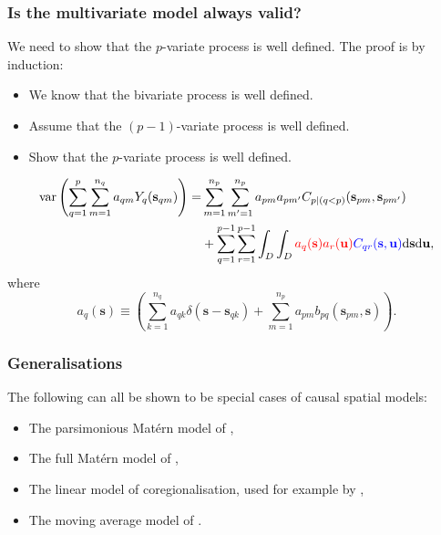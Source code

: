 \documentclass{beamer}
\newcommand{\intd} {\mathrm{d}}
\newcommand{\svec} {\textbf{s}}
\newcommand{\uvec} {\textbf{u}}
\newcommand{\var}{\mathrm{var}}
\newcommand{\red}{\textcolor{red}}%
\newcommand{\blue}{\textcolor{blue}}
\begin{document}
\begin{frame}
\frametitle{Is the multivariate model always valid?}

We need to show that the $p$-variate process is well defined. The proof is by induction:
\begin{itemize}
  \item We know that the bivariate process is well defined.
  \item Assume that the $(p-1)$-variate process is well defined.
  \item Show that the $p$-variate process is well defined.
\end{itemize}

\vspace{-0.3in}
\begin{align*}
\var\left(\sum_{q=1}^p \sum_{m=1}^{n_q} a_{qm}Y_q(\svec_{qm})\right)=& \sum_{m=1}^{n_p}\sum_{m'=1}^{n_p}a_{pm}a_{pm'}C_{p \mid  (q < p)}(\svec_{pm},\svec_{pm'}) \\
&+ \sum_{q=1}^{p-1}\sum_{r=1}^{p-1}\int_D\int_D\red{a_q(\svec)a_r(\uvec)}\blue{C_{qr}(\svec,\uvec)}\intd \svec \intd \uvec, 
\end{align*}
where
\begin{equation*}
a_q(\svec) \equiv \left(\sum_{k=1}^{n_q}a_{qk}\delta(\svec - \svec_{qk}) + \sum_{m=1}^{n_p}a_{pm}b_{pq}(\svec_{pm},\svec)\right).
\end{equation*}
\end{frame}


\begin{frame}
\frametitle{Generalisations}

The following can all be shown to be special cases of causal spatial models:

\begin{itemize}
\item The parsimonious Mat{\'e}rn model of \cite{Gneitingetal2010},
\item The full Mat{\'e}rn model of \cite{Gneitingetal2010},
\item The linear model of coregionalisation, used for example by \cite{Wackernagel1995},
\item The moving average model of \cite{verHoef_1998}.
\end{itemize}
\end{frame}

\end{document}
